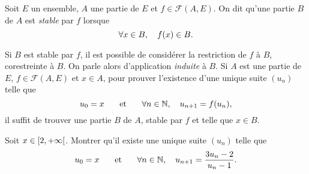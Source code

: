 \documentclass{magnolia}
\begin{document}
\begin{definition}
Soit $E$ un ensemble, $A$ une partie de $E$ et $f\in\mathcal{F}(A, E)$. On dit qu'une
partie $B$ de $A$ est \emph{stable} par $f$ lorsque
\[\forall x\in B,\quad f(x)\in B.\]
\end{definition}

\begin{remarques}
\remarque Si $B$ est stable par $f$, il est possible de considérer la restriction de
  $f$ à $B$, corestreinte à $B$. On parle alors d'application \emph{induite} à $B$.
\remarque Si $A$ est une partie de $E$, $f\in\mathcal{F}(A, E)$ et $x\in A$,
  pour prouver l'existence d'une unique suite $(u_n)$ telle que
\[u_0=x \quad\quad\!\text{et}\quad\!\quad \forall n\in\mathbb{N},\quad u_{n+1}=f(u_n),\]
  il suffit de trouver une partie $B$ de $A$, stable par $f$ et telle que
  $x\in B$.
\end{remarques}

\begin{exoUnique}
\exo Soit $x\in\left[2,+\infty\right[$. Montrer qu'il existe une unique suite $(u_n)$ telle que
  \[u_0= x \quad\quad\!\text{et}\quad\!\quad \forall n\in\mathbb{N},\quad u_{n+1}= \frac{3 u_n-2}{u_n-1}.\]
\end{exoUnique}






\end{document}
